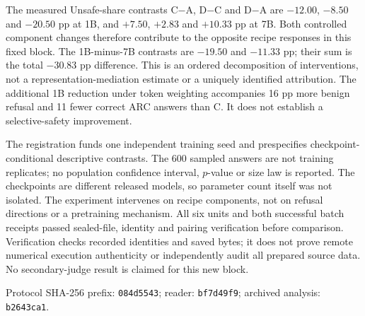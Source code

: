 \documentclass{article}
\begin{document}
The measured Unsafe-share contrasts C$-$A, D$-$C and D$-$A are
$-12.00$, $-8.50$ and $-20.50$ pp at 1B, and $+7.50$, $+2.83$ and
$+10.33$ pp at 7B. Both controlled component changes therefore contribute to
the opposite recipe responses in this fixed block. The 1B-minus-7B
contrasts are $-19.50$ and $-11.33$ pp; their sum is the total $-30.83$ pp
difference. This is an ordered decomposition of interventions, not a
representation-mediation estimate or a uniquely identified attribution.
The additional 1B reduction under token weighting accompanies 16 pp more
benign refusal and 11 fewer correct ARC answers than C. It does not establish
a selective-safety improvement.

The registration funds one independent training seed and prespecifies
checkpoint-conditional descriptive contrasts. The 600 sampled answers are
not training replicates; no population confidence interval, $p$-value or
size law is reported. The checkpoints are different released models, so
parameter count itself was not isolated. The experiment intervenes on
recipe components, not on refusal directions or a pretraining mechanism.
All six units and both successful batch receipts passed sealed-file,
identity and pairing verification before comparison. Verification checks
recorded identities and saved bytes; it does not prove remote numerical
execution authenticity or independently audit all prepared source data.
No secondary-judge result is claimed for this new block.

Protocol SHA-256 prefix: \texttt{084d5543}; reader:
\texttt{bf7d49f9}; archived analysis: \texttt{b2643ca1}.
\end{document}
